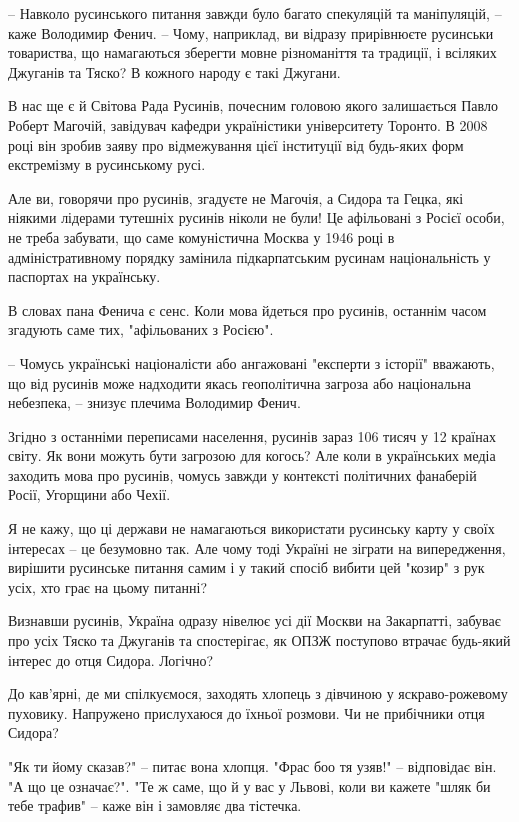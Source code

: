 – Навколо русинського питання завжди було багато спекуляцій та маніпуляцій, –
каже Володимир Фенич. – Чому, наприклад, ви відразу прирівнюєте русинськи
товариства, що намагаються зберегти мовне різноманіття та традиції, і всіляких
Джуганів та Тяско? В кожного народу є такі Джугани.

В нас ще є й Світова Рада Русинів, почесним головою якого залишається Павло
Роберт Магочій, завідувач кафедри україністики університету Торонто. В 2008
році він зробив заяву про відмежування цієї інституції від будь-яких форм
екстремізму в русинському русі.

Але ви, говорячи про русинів, згадуєте не Магочія, а Сидора та Гецка, які
ніякими лідерами тутешніх русинів ніколи не були! Це афільовані з Росієї особи,
не треба забувати, що саме комуністична Москва у 1946 році в адміністративному
порядку замінила підкарпатським русинам національність у паспортах на
українську.

В словах пана Фенича є сенс. Коли мова йдеться про русинів, останнім часом
згадують саме тих, "афільованих з Росією".

– Чомусь українські націоналісти або ангажовані "експерти з історії" вважають,
що від русинів може надходити якась геополітична загроза або національна
небезпека, – знизує плечима Володимир Фенич.

Згідно з останніми переписами населення, русинів зараз 106 тисяч у 12 країнах
світу. Як вони можуть бути загрозою для когось? Але коли в українських медіа
заходить мова про русинів, чомусь завжди у контексті політичних фанаберій
Росії, Угорщини або Чехії.

Я не кажу, що ці держави не намагаються використати русинську карту у своїх
інтересах – це безумовно так. Але чому тоді Україні не зіграти на випередження,
вирішити русинське питання самим і у такий спосіб вибити цей "козир" з рук
усіх, хто грає на цьому питанні?

Визнавши русинів, Україна одразу нівелює усі дії Москви на Закарпатті, забуває
про усіх Тяско та Джуганів та спостерігає, як ОПЗЖ поступово втрачає будь-який
інтерес до отця Сидора. Логічно?

До кав’ярні, де ми спілкуємося, заходять хлопець з дівчиною у яскраво-рожевому
пуховику. Напружено прислухаюся до їхньої розмови. Чи не прибічники отця
Сидора?

"Як ти йому сказав?" – питає вона хлопця. "Фрас боо тя узяв!" – відповідає він.
"А що це означає?". "Те ж саме, що й у вас у Львові, коли ви кажете "шляк би
тебе трафив" – каже він і замовляє два тістечка.


